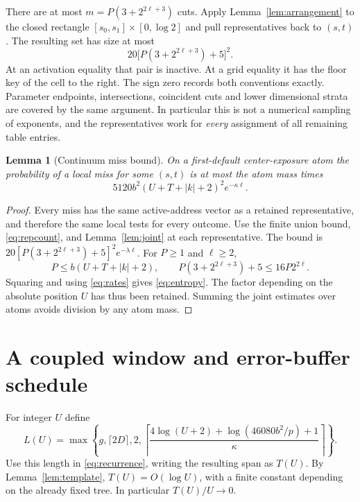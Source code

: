 \documentclass[11pt]{article}
\newtheorem{lemma}[theorem]{Lemma}
\theoremstyle{definition}
\theoremstyle{remark}
\begin{document}
There are at most $m=P(3+2^{2\ell+3})$ cuts. Apply
Lemma~\ref{lem:arrangement} to the closed rectangle
$[s_0,s_1]\times[0,\log2]$ and pull representatives back to $(s,t)$.
The resulting set has size at most
\begin{equation}\label{eq:repcount}
 20\bigl[P(3+2^{2\ell+3})+5\bigr]^2.
\end{equation}
At an activation equality that pair is inactive. At a grid equality it has
the floor key of the cell to the right. The sign zero records both conventions
exactly. Parameter endpoints, intersections, coincident cuts and lower
dimensional strata are covered by the same argument. In particular this is
not a numerical sampling of exponents, and the representatives work for
\emph{every} assignment of all remaining table entries.

\begin{lemma}[Continuum miss bound]\label{lem:entropy}
On a first-default center-exposure atom the probability of a local miss for
some $(s,t)$ is at most the atom mass times
\begin{equation}\label{eq:entropy}
 5120 b^2(U+T+|k|+2)^2 e^{-\kappa\ell}.
\end{equation}
\end{lemma}
\begin{proof}
Every miss has the same active-address vector as a retained representative,
and therefore the same local tests for every outcome. Use the finite union
bound, \eqref{eq:repcount}, and Lemma~\ref{lem:joint} at each representative.
The bound is
$20[P(3+2^{2\ell+3})+5]^2 e^{-\lambda\ell}$.
For $P\geq1$ and $\ell\geq2$,
\[
 P\leq b(U+T+|k|+2),\qquad
 P(3+2^{2\ell+3})+5\leq16P2^{2\ell}.
\]
Squaring and using \eqref{eq:rates} gives \eqref{eq:entropy}.
The factor depending on the absolute position $U$ has thus been retained.
Summing the joint estimates over atoms avoids division by any atom mass.
\end{proof}

\section{A coupled window and error-buffer schedule}\label{sec:schedule}
For integer $U$ define
\begin{equation}\label{eq:Lschedule}
 L(U)=\max\left\{g,\lceil2D\rceil,2,
 \left\lceil\frac{4\log(U+2)+\log(46080b^2/p)+1}{\kappa}\right\rceil\right\}.
\end{equation}
Use this length in \eqref{eq:recurrence}, writing the resulting span as $T(U)$.
By Lemma~\ref{lem:template}, $T(U)=O(\log U)$, with a finite constant depending
on the already fixed tree. In particular $T(U)/U\to0$.
\end{document}
